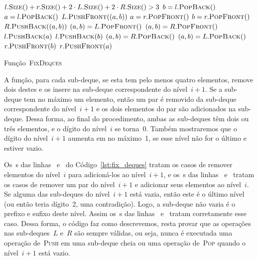 \documentclass[../../main.tex]{subfiles}
\begin{document}
\begin{algorithm}
\begin{algorithmic}[1]

\Require $l.\Call{Size}{\null} + r.\Call{Size}{\null} + 2\cdot L.\Call{Size}{\null} + 2\cdot R.\Call{Size}{\null} > 3$
     \label{line:fd:if5}
        \State $b = {l}.\Call{PopBack}{\null}$
        \State $a = {l}.\Call{PopBack}{\null}$
        \State ${L}.\Call{PushFront}{(a, b)}$
    \EndIf
     \label{line:fd:if6}
        \State $a = {r}.\Call{PopFront}{\null}$
        \State $b = {r}.\Call{PopFront}{\null}$
        \State ${R}.\Call{PushBack}{(a, b)}$
    \EndIf
     \label{line:fd:if3}
         \label{line:fd:if1}
            \State $(a, b) = {L}.\Call{PopFront}{\null}$
        \Else
            \State $(a, b) = {R}.\Call{PopFront}{\null}$
        \EndIf
        \State ${l}.\Call{PushBack}{a}$
        \State ${l}.\Call{PushBack}{b}$
    \EndIf
     \label{line:fd:if4}
         \label{line:fd:if2}
            \State $(a, b) = {R}.\Call{PopBack}{\null}$
        \Else
            \State $(a, b) = {L}.\Call{PopBack}{\null}$
        \EndIf
        \State ${r}.\Call{PushFront}{b}$
        \State ${r}.\Call{PushFront}{a}$
    \EndIf
\EndFunction

\end{algorithmic}
\caption{Função~\textsc{FixDeques}} \label{lst:fix_deques}
\end{algorithm}

A função, para cada sub-deque, se esta tem pelo menos quatro elementos, remove dois destes e os insere na sub-deque correspondente do nível~$i+1$. Se a sub-deque tem no máximo um elemento, então um par é removido da sub-deque correspondente do nível~$i+1$ e os dois elementos do par são adicionados na sub-deque. Dessa forma, ao final do procedimento, ambas as sub-deques têm dois ou três elementos, e o dígito do nível~$i$ se torna~0. Também mostraremos que o dígito do nível~$i+1$ aumenta em no máximo~1, se esse nível não for o último e estiver vazio.

Os~s das linhas~ e~ do Código~\ref{lst:fix_deques} tratam os casos de remover elementos do nível~$i$ para adicioná-los ao nível~${i+1}$, e os~s das linhas~ e~ tratam os casos de remover um par do nível~$i+1$ e adicionar seus elementos ao nível~$i$. Se alguma das sub-deques do nível~$i+1$ está vazia, então este é o último nível (ou então teria dígito~2, uma contradição). Logo, a sub-deque não vazia é o prefixo e sufixo deste nível. Assim os~s das linhas~ e~ tratam corretamente esse caso. Dessa forma, o código faz como descrevemos, resta provar que as operações nas sub-deques~$L$ e~$R$ são sempre válidas, ou seja, nunca é executada uma operação de~\textsc{Push} em uma sub-deque cheia ou uma operação de~\textsc{Pop} quando o nível~$i+1$ está vazio.
\end{document}
